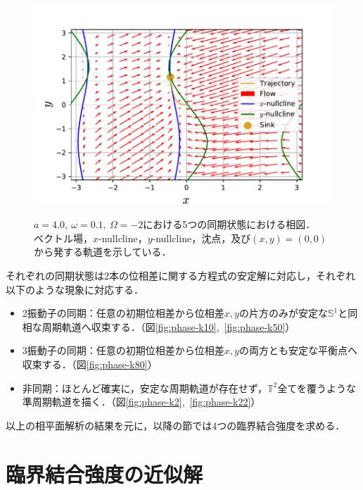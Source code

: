 \documentclass[../main]{subfiles}
\begin{document}
\begin{figure}[tbp]
\begin{minipage}[b]{0.47\linewidth}
      \includegraphics[keepaspectratio, scale=0.42]{images/phase_a4K80.pdf}
      \label{fig:phase-k80}
    \end{minipage}
    \caption{$a=4.0,\ \omega=0.1,\ \Omega=-2$における5つの同期状態における相図．\\
    ベクトル場，$x$-nullcline，$y$-nullcline，沈点，及び$(x,y)=(0,0)$から発する軌道を示している．}
    \label{fig:phase}
\end{figure}

それぞれの同期状態は2本の位相差に関する方程式の安定解に対応し，それぞれ以下のような現象に対応する．
\begin{itemize}
    \item 
    2振動子の同期：任意の初期位相差から位相差$x,y$の片方のみが安定な$\mathbb{S}^1$と同相な周期軌道へ収束する．（図\ref{fig:phase-k10},\ \ref{fig:phase-k50}）
    \item
    3振動子の同期：任意の初期位相差から位相差$x,y$の両方とも安定な平衡点へ収束する．（図\ref{fig:phase-k80}）
    \item
    非同期：ほとんど確実に，安定な周期軌道が存在せず，$\mathbb{T}^2$全てを覆うような準周期軌道を描く．（図\ref{fig:phase-k2},\ \ref{fig:phase-k22}）
\end{itemize}
以上の相平面解析の結果を元に，以降の節では4つの臨界結合強度を求める．
\section{臨界結合強度の近似解}
\label{sec:3body-critical}
\end{document}
